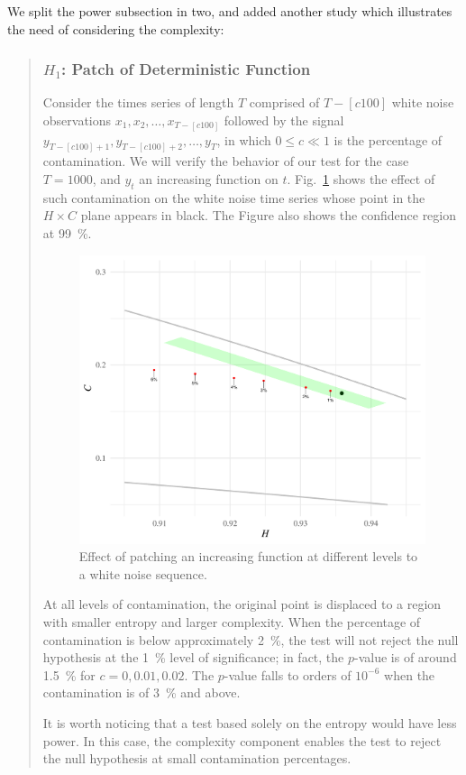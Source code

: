 \documentclass[alpha-refs]{wiley-article}
\begin{document}
We split the power subsection in two, and added another study which illustrates the need of considering the complexity:
\begin{quote}
	\subsubsection{$H_1$: Patch of Deterministic Function}
	
Consider the times series of length $T$ comprised of $T-[c100]$ white noise observations $x_1,x_2,\dots, x_{T-[c100]}$ followed by the signal $y_{T-[c100]+1}, y_{T-[c100]+2}, \dots, y_T$, in which $0\leq c \ll 1$ is the percentage of contamination.
We will verify the behavior of our test for the case $T=1000$, and $y_t$ an increasing function on $t$.
Fig.~\ref{Fig:PointsPatchedIncreasingFunction} shows the effect of such contamination on the white noise time series whose point in the $H\times C$ plane appears in black.
The Figure also shows the confidence region at \SI{99}{\percent}.
	
	\begin{figure}[hbt]
		\centering
		\includegraphics[width=.7\linewidth]{Figures/PointsPatchedIncreasingFunction}
		\caption{Effect of patching an increasing function at different levels to a white noise sequence.}\label{Fig:PointsPatchedIncreasingFunction}
	\end{figure}
	
At all levels of contamination, the original point is displaced to a region with smaller entropy and larger complexity.
When the percentage of contamination is below approximately \SI{2}{\percent}, the test will not reject the null hypothesis at the \SI{1}{\percent} level of significance; in fact, the $p$-value is of around \SI{1.5}{\percent} for $c=0,0.01,0.02$.
The $p$-value falls to orders of $10^{-6}$ when the contamination is of \SI{3}{\percent} and above.

It is worth noticing that a test based solely on the entropy would have less power.
In this case, the complexity component enables the test to reject the null hypothesis at small contamination percentages.
\end{quote}
\end{document}
